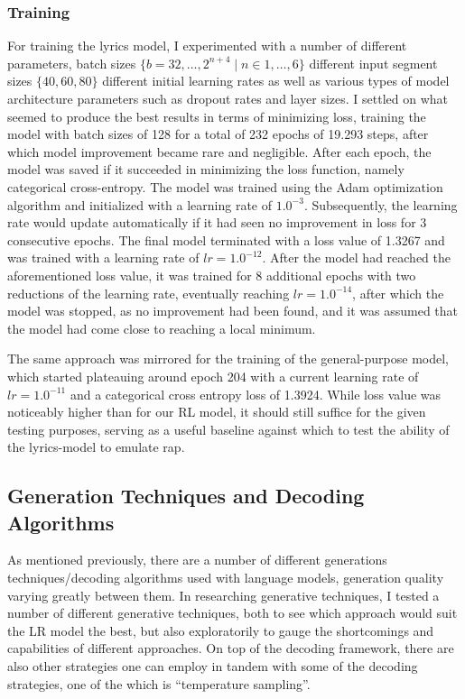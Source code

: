 \subsubsection{Training}
\label{sec:model-training}

For training the lyrics model, I experimented with a number of different parameters, batch sizes $\{b=32, \ldots, 2^{n+4} \mid n \in{1,\ldots,6}\}$ different input segment sizes $\{40,60,80\}$ different initial learning rates as well as various types of model architecture parameters such as dropout rates and layer sizes. I settled on what seemed to produce the best results in terms of minimizing loss, training the model with batch sizes of 128 for a total of 232 epochs of 19.293 steps, after which model improvement became rare and negligible. After each epoch, the model was saved if it succeeded in minimizing the loss function, namely categorical cross-entropy. The model was trained using the Adam optimization algorithm \cite{KingmaDiederikP2014AAMf} and initialized with a learning rate of $1.0^{-3}$. Subsequently, the learning rate would update automatically if it had seen no improvement in loss for 3 consecutive epochs. The final model terminated with a loss value of 1.3267 and was trained with a learning rate of $lr=1.0^{-12}$. After the model had reached the aforementioned loss value, it was trained for 8 additional epochs with two reductions of the learning rate, eventually reaching $lr=1.0^{-14}$, after which the model was stopped, as no improvement had been found, and it was assumed that the model had come close to reaching a local minimum.

The same approach was mirrored for the training of the general-purpose model, which started plateauing around epoch 204 with a current learning rate of $lr=1.0^{-11}$ and a categorical cross entropy loss of 1.3924. While loss value was noticeably higher than for our RL model, it should still suffice for the given testing purposes, serving as a useful baseline against which to test the ability of the lyrics-model to emulate rap.

\subsection{Generation Techniques and Decoding Algorithms}
\label{sec:generation-techs}

As mentioned previously, there are a number of different generations techniques/decoding algorithms used with language models, generation quality varying greatly between them. In researching generative techniques, I tested a number of different generative techniques, both to see which approach would suit the LR model the best, but also exploratorily to gauge the shortcomings and capabilities of different approaches. On top of the decoding framework, there are also other strategies one can employ in tandem with some of the decoding strategies, one of the which is “temperature sampling”.

